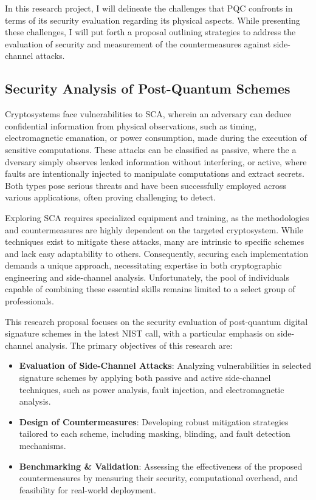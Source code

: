 \documentclass[11pt, a4paper]{article}
\begin{document}
In this research project, I will delineate the challenges that PQC confronts 
in terms of its security evaluation regarding its physical aspects. While presenting these challenges, 
I will put forth a proposal outlining strategies to address the evaluation of security and measurement of 
the countermeasures against side-channel attacks. 

\subsection*{Security Analysis of Post-Quantum Schemes}\label{sec:an}\vspace{-0.1cm}

Cryptosystems face vulnerabilities to SCA, wherein an adversary can deduce 
confidential information from physical observations, such as timing,
electromagnetic emanation, or power consumption, made during the execution of 
sensitive computations. These attacks can be classified as passive, where the a
dversary simply observes leaked information without interfering, or active, 
where faults are intentionally injected to manipulate computations and extract 
secrets. Both types pose serious threats and have been successfully employed 
across various applications, often proving challenging to detect.

Exploring SCA requires specialized equipment and training, as the 
methodologies and countermeasures are highly dependent on the targeted 
cryptosystem. While techniques exist to mitigate these attacks, many are 
intrinsic to specific schemes and lack easy adaptability to others. Consequently, 
securing each implementation demands a unique approach, necessitating 
expertise in both cryptographic engineering and side-channel analysis. 
Unfortunately, the pool of individuals capable of combining these
essential skills remains limited to a select group of professionals.


This research proposal focuses on the security evaluation of 
post-quantum digital signature schemes in the latest NIST 
call, with a particular emphasis on side-channel analysis. 
The primary objectives of this research are:

\begin{itemize}
\setlength{\itemsep}{0.1pt}
    \item \textbf{Evaluation of Side-Channel Attacks}: Analyzing vulnerabilities in selected signature schemes by applying both passive and active side-channel techniques, such as power analysis, fault injection, and electromagnetic analysis.
    \item \textbf{Design of Countermeasures}: Developing robust mitigation strategies tailored to each scheme, including masking, blinding, and fault detection mechanisms.
    \item \textbf{Benchmarking \& Validation}: Assessing the effectiveness of the proposed countermeasures by measuring their security, computational overhead, and feasibility for real-world deployment.
\end{itemize}
\end{document}
